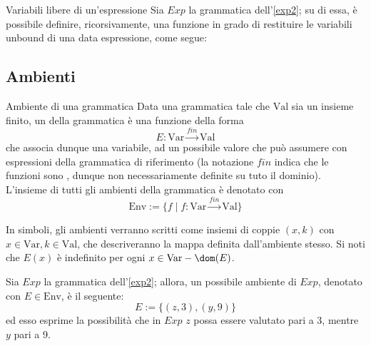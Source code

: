 \documentclass[a4paper, 12pt]{report}
\begin{document}
    \begin{framedobs}{Variabili libere di un'espressione}
        Sia $Exp$ la grammatica dell'\cref{exp2}; su di essa, è possibile definire, ricorsivamente, una funzione in grado di restituire le variabili unbound di una data espressione, come segue: 
    \end{framedobs}

    \subsection{Ambienti}
    
    \begin{frameddefn}{Ambiente di una grammatica}
        Data una grammatica tale che $\mathrm{Val}$ sia un insieme finito, un  della grammatica è una funzione della forma $$E: \mathrm{Var} \xrightarrow{fin} \mathrm{Val}$$ che associa dunque una variabile, ad un possibile valore che può assumere con espressioni della grammatica di riferimento (la notazione $fin$ indica che le funzioni sono , dunque non necessariamente definite su tuto il dominio). L'insieme di tutti gli ambienti della grammatica è denotato con $$\mathrm{Env} := \{f \mid f : \mathrm{Var} \xrightarrow{fin} \mathrm{Val} \}$$

        In simboli, gli ambienti verranno scritti come insiemi di coppie $(x, k)$ con $x \in \mathrm{Var}, k \in \mathrm{Val}$, che descriveranno la mappa definita dall'ambiente stesso. Si noti che $E(x)$ è indefinito per ogni $x \in \mathrm{Var} - \dom(E)$.
    \end{frameddefn}

    \begin{example}
        Sia $Exp$ la grammatica dell'\cref{exp2}; allora, un possibile ambiente di $Exp$, denotato con $E \in \mathrm{Env}$, è il seguente: $$E := \{(z,3), (y, 9) \}$$ ed esso esprime la possibilità che in $Exp$ $z$ possa essere valutato pari a 3, mentre $y$ pari a 9.
    \end{example}
\end{document}
